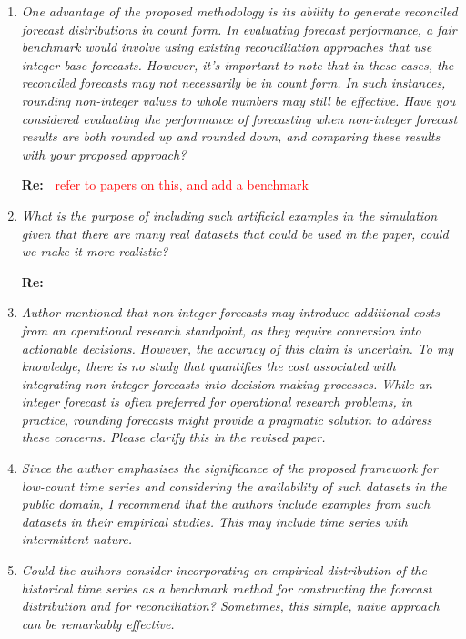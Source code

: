\documentclass[11pt,a4paper]{article}
\newcommand{\RE}[2][Re:~]{{\color{blue}\textbf{#1}#2}}
\begin{document}
\begin{enumerate}
  \item \textit{One advantage of the proposed methodology is its ability to generate reconciled forecast distributions in count form. In evaluating forecast performance, a fair benchmark would involve using existing reconciliation approaches that use integer base forecasts. However, it's important to note that in these cases, the reconciled forecasts may not necessarily be in count form. In such instances, rounding non-integer values to whole numbers may still be effective. Have you considered evaluating the performance of forecasting when non-integer forecast results are both rounded up and rounded down, and comparing these results with your proposed approach?}

  \RE{}
  \textcolor{red}{refer to papers on this, and add a benchmark}


  \item \textit{What is the purpose of including such artificial examples in the simulation given that there are many real datasets that could be used in the paper, could we make it more realistic?}

  \RE{}

  \item \textit{Author mentioned that non-integer forecasts may introduce additional costs from an operational research standpoint, as they require conversion into actionable decisions. However, the accuracy of this claim is uncertain. To my knowledge, there is no study that quantifies the cost associated with integrating non-integer forecasts into decision-making processes. While an integer forecast is often preferred for operational research problems, in practice, rounding forecasts might provide a pragmatic solution to address these concerns. Please clarify this in the revised paper.}
  
  \item \textit{Since the author emphasises the significance of the proposed framework for low-count time series and considering the availability of such datasets in the public domain, I recommend that the authors include examples from such datasets in their empirical studies. This may include time series with intermittent nature.}
  
  \item \textit{Could the authors consider incorporating an empirical distribution of the historical time series as a benchmark method for constructing the forecast distribution and for reconciliation? Sometimes, this simple, naive approach can be remarkably effective.}
  

\end{enumerate}
\end{document}
